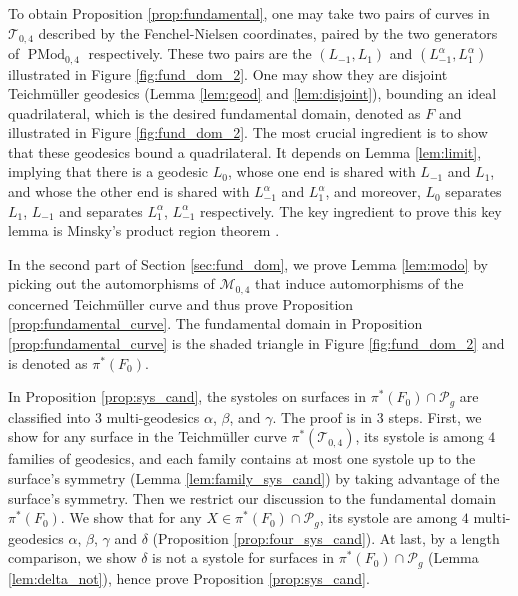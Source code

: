 \documentclass[UTF8]{amsart}
\numberwithin{equation}{section}
\theoremstyle{definition}
\theoremstyle{example}
\theoremstyle{remark}
\DeclareMathOperator{\pmodo}{PMod}
\begin{document}
To obtain Proposition \ref{prop:fundamental}, one may take two pairs of curves in $\mathcal{T}_{0,4}$ described by the Fenchel-Nielsen coordinates, paired by the two generators of $\pmodo_{0,4}$ respectively. 
These two pairs are the $(L_{-1}, L_1)$ and $(L_{-1}^{\alpha}, L_1^{\alpha})$ illustrated in Figure \ref{fig:fund_dom_2}. 
One may show they are disjoint Teichm\"uller geodesics (Lemma \ref{lem:geod} and \ref{lem:disjoint}), bounding an ideal quadrilateral, which is the desired fundamental domain, denoted as $F$ and illustrated in Figure \ref{fig:fund_dom_2}. The most crucial ingredient is to show that these geodesics bound a quadrilateral. It depends on Lemma \ref{lem:limit}, implying that there is a geodesic $L_0$, whose one end is shared with $L_{-1}$ and $L_1$, and whose the other end is shared with $L_{-1}^{\alpha}$ and $L_1^{\alpha}$, and moreover, $L_0$ separates $L_1$, $L_{-1}$ and separates $L_1^{\alpha}$, $L_{-1}^{\alpha}$ respectively. The key ingredient to prove this key lemma is Minsky's product region theorem \cite{minsky1996extremal}.

In the second part of Section \ref{sec:fund_dom}, we prove Lemma \ref{lem:modo} by picking out the automorphisms of $\mathcal{M}_{0,4}$ that induce automorphisms of the concerned Teichm\"uller curve and thus prove Proposition \ref{prop:fundamental_curve}. The fundamental domain in Proposition \ref{prop:fundamental_curve} is the shaded triangle in Figure \ref{fig:fund_dom_2} and is denoted as $\pi^{*}(F_0)$. 

In Proposition \ref{prop:sys_cand}, the systoles on surfaces in $\pi^{*}(F_0)\cap \mathcal{P}_g$ are classified into $3$ multi-geodesics $\alpha$, $\beta$, and $\gamma$.
The proof is in $3$ steps. First, we show 
for any surface 
in the Teichm\"uller curve $\pi^{*}(\mathcal{T}_{0,4})$, its systole is among $4$ families of geodesics, and each family contains at most one systole up to the surface's symmetry (Lemma \ref{lem:family_sys_cand}) by taking advantage of the surface's symmetry. 
Then we restrict our discussion to the fundamental domain $\pi^{*}(F_0)$. We show that for any $X\in \pi^{*}(F_0)\cap \mathcal{P}_g$, its systole are among $4$ multi-geodesics $\alpha$, $\beta$, $\gamma$ and $\delta$ (Proposition \ref{prop:four_sys_cand}). 
At last, by a length comparison, we show $\delta$ is not a systole for surfaces in $\pi^{*}(F_0)\cap \mathcal{P}_g$ (Lemma \ref{lem:delta_not}), hence prove Proposition \ref{prop:sys_cand}. 
\end{document}
